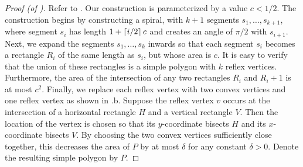 \documentclass{birkjour}
\begin{document}
\begin{proof}[Proof (of )]
Refer to .
Our construction is parameterized by a value $c <1/2$.
The construction begins by constructing a spiral, with $k+1$ segments
$s_1,\ldots,s_{k+1}$, where segment $s_i$ has length $1+\left\lceil i/2 \right\rceil c$
and creates an angle of $\pi/2$ with $s_{i+1}$.  Next, 
we expand the segments $s_1,\ldots,s_k$ inwards so
that each segment $s_i$ becomes a rectangle $R_i$ of the same length
as $s_i$, but whose area is $c$.  It is easy to verify that the
union of these rectangles is a simple polygon with $k$ reflex
vertices.  Furthermore, the area of the intersection of any two
rectangles $R_i$ and $R_i+1$ is at most $c^2$.  Finally, we replace
each reflex vertex with two convex vertices and one reflex vertex as
shown in .b. Suppose the reflex vertex $v$ occurs
at the intersection of a horizontal rectangle $H$ and a vertical
rectangle $V$.  Then the location of the vertex is chosen so that its
$y$-coordinate bisects $H$ and its $x$-coordinate bisects $V$.  By
choosing the two convex vertices sufficiently close together, this
decreases the area of $P$ by at most $\delta$ for any constant $\delta
> 0$.  Denote
the resulting simple polygon by $P$.


\end{proof}
\end{document}

